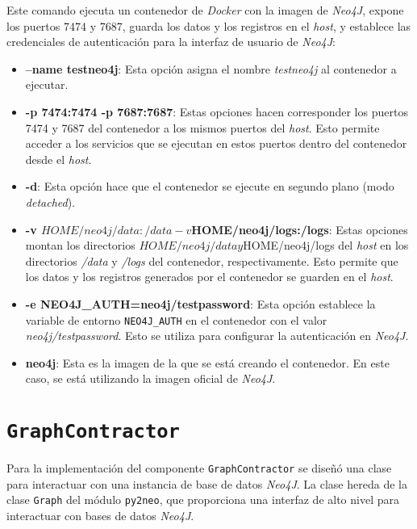 Este comando ejecuta un contenedor de \textit{Docker} con la imagen de \textit{Neo4J}, expone los puertos 7474 y 7687, guarda los datos y los registros en el \textit{host}, y establece las credenciales de autenticación para la interfaz de usuario de \textit{Neo4J}:

\begin{itemize}

    \item \textbf{--name testneo4j}: Esta opción asigna el nombre \textit{testneo4j} al contenedor a ejecutar.

   	\item \textbf{-p 7474:7474 -p 7687:7687}: Estas opciones hacen corresponder los puertos 7474 y 7687 del contenedor a los mismos puertos del \textit{host}. Esto permite acceder a los servicios que se ejecutan en estos puertos dentro del contenedor desde el \textit{host}.

    \item \textbf{-d}: Esta opción hace que el contenedor se ejecute en segundo plano (modo \textit{detached}).

    \item \textbf{-v $HOME/neo4j/data:/data -v $HOME/neo4j/logs:/logs}: Estas opciones montan los directorios $HOME/neo4j/data y $HOME/neo4j/logs del \textit{host} en los directorios \textit{/data} y \textit{/logs} del contenedor, respectivamente. Esto permite que los datos y los registros generados por el contenedor se guarden en el \textit{host}.

    \item \textbf{-e NEO4J\_AUTH=neo4j/testpassword}: Esta opción establece la variable de entorno \texttt{NEO4J\_AUTH} en el contenedor con el valor \textit{neo4j/testpassword}. Esto se utiliza para configurar la autenticación en \textit{Neo4J}.

    \item \textbf{neo4j}: Esta es la imagen de la que se está creando el contenedor. En este caso, se está utilizando la imagen oficial de \textit{Neo4J}.

\end{itemize}

\section{\texttt{GraphContractor}}

Para la implementación del componente \texttt{GraphContractor} se diseñó una clase para interactuar con una instancia de base de datos \textit{Neo4J}. La clase hereda de la clase \texttt{Graph} del módulo \texttt{py2neo}, que proporciona una interfaz de alto nivel para interactuar con bases de datos \textit{Neo4J}.

